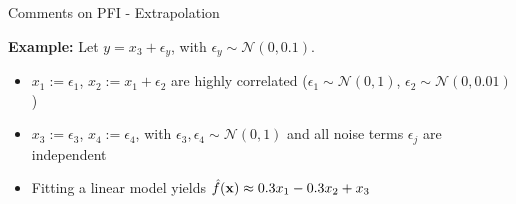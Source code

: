 \documentclass[10pt,compress,t,notes=noshow, xcolor=table]{beamer}
\begin{document}
\begin{frame}{Comments on PFI - Extrapolation}
 
 



\textbf{Example:} Let $y = x_3 + \epsilon_y$, with $\epsilon_y \sim \mathcal{N}(0, 0.1)$.

\begin{itemize}
  \item $x_1 := \epsilon_1$, $x_2 := x_1 + \epsilon_2$ are highly correlated  
        ($\epsilon_1 \sim \mathcal{N}(0,1)$, $\epsilon_2 \sim \mathcal{N}(0, 0.01)$)
  \item $x_3 := \epsilon_3$, $x_4 := \epsilon_4$, with $\epsilon_3, \epsilon_4 \sim \mathcal{N}(0,1)$ and all noise terms $\epsilon_j$ are independent
  \item Fitting a linear model yields $\hat{f}(\mathbf{x}) \approx 0.3 x_1 - 0.3 x_2 + x_3$
\end{itemize}


\end{frame}
\end{document}
